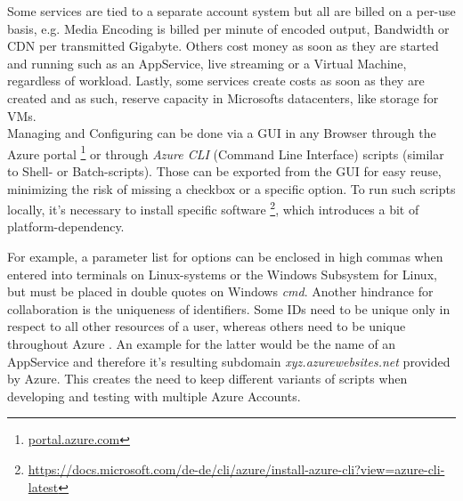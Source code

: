Some services are tied to a separate account system but all are billed on a per-use basis, e.g.
Media Encoding is billed per minute of encoded output, Bandwidth or CDN per transmitted Gigabyte.
Others cost money as soon as they are started and running such as an AppService, live streaming 
or a Virtual Machine, regardless of workload. Lastly, some services create costs as soon as they
are created and as such, reserve capacity in Microsofts datacenters, like storage for VMs. \\
Managing and Configuring can be done via a GUI in any Browser through the 
Azure portal \footnote{\url{portal.azure.com}} or through \textit{Azure CLI} 
(Command Line Interface) scripts (similar to Shell- or Batch-scripts). Those 
can be exported from the GUI for easy reuse, minimizing the risk of missing a 
checkbox or a specific option. To run such scripts locally, it's necessary to 
install specific software \footnote{\url{https://docs.microsoft.com/de-de/cli/azure/install-azure-cli?view=azure-cli-latest}}, which introduces a bit of platform-dependency. 

For example, a parameter list for options can be enclosed in high commas when entered into 
terminals on Linux-systems or the Windows Subsystem for Linux, but must be placed in double quotes on Windows \textit{cmd}.
Another hindrance for collaboration is the uniqueness of identifiers. Some IDs need to be unique
only in respect to all other resources of a user, whereas others need to be unique throughout Azure \cite{azNaming}. 
An example for the latter would be the name of an AppService and therefore it's resulting
subdomain \textit{xyz.azurewebsites.net} provided by Azure. This creates the need to keep different variants of scripts when developing and testing with multiple Azure Accounts.

